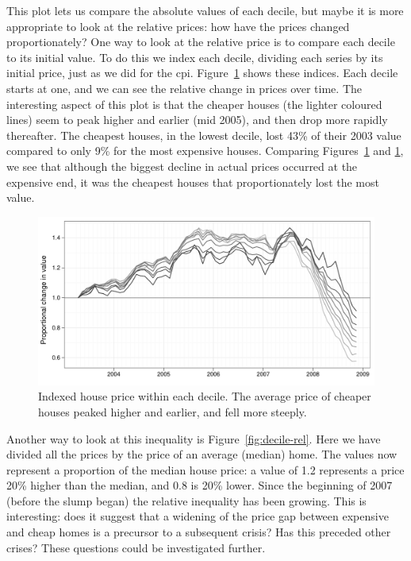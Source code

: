 \documentclass[oneside]{article}
\begin{document}
This plot lets us compare the absolute values of each decile, but maybe it is more appropriate to look at the relative prices: how have the prices changed proportionately?  One way to look at the relative price is to compare each decile to its initial value.  To do this we index each decile, dividing each series by its initial price, just as we did for the {\sc cpi}. Figure~\ref{fig:decile-ind} shows these indices.  Each decile starts at one, and we can see the relative change in prices over time.  The interesting aspect of this plot is that the cheaper houses (the lighter coloured lines) seem to peak higher and earlier (mid 2005), and then drop more rapidly thereafter.  The cheapest houses, in the lowest decile, lost 43\% of their 2003 value compared to only 9\% for the most expensive houses. Comparing Figures~\ref{fig:decile-ind} and \ref{fig:decile-ind}, we see that although the biggest decline in actual prices occurred at the expensive end, it was the cheapest houses that proportionately lost the most value. 

\begin{figure}[htbp]
  \centering
  \includegraphics[width=0.75\linewidth]{decile-ind}
  \caption{Indexed house price within each decile.  The average price of cheaper houses peaked higher and earlier, and fell more steeply.}
  \label{fig:decile-ind}
\end{figure}

Another way to look at this inequality is Figure~\ref{fig:decile-rel}.  Here we have divided all the prices by the price of an average (median) home.  The values now represent a proportion of the median house price: a value of 1.2 represents a price 20\% higher than the median, and 0.8 is 20\% lower. Since the beginning of 2007 (before the slump began) the relative inequality has been growing.  This is interesting: does it suggest that a widening of the price gap between expensive and cheap homes is a precursor to a subsequent crisis? Has this preceded other crises? These questions could be investigated further.
\end{document}

